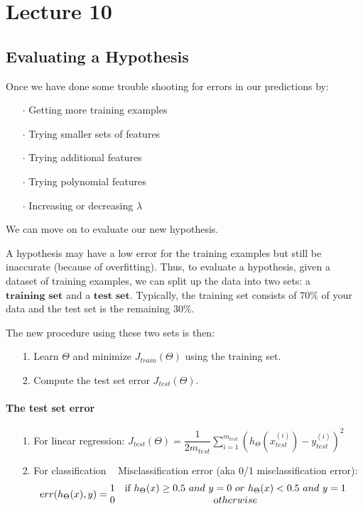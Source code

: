 \documentclass[UTF8]{article}
\begin{document}
\newpage

\section{Lecture 10}

\subsection{Evaluating a Hypothesis}

Once we have done some trouble shooting for errors in our predictions by:

\begin{itemize}
\item[$\cdot$]Getting more training examples
\item[$\cdot$]Trying smaller sets of features
\item[$\cdot$]Trying additional features
\item[$\cdot$]Trying polynomial features
\item[$\cdot$]Increasing or decreasing $\lambda$
\end{itemize}

We can move on to evaluate our new hypothesis.

A hypothesis may have a low error for the training examples but still be inaccurate (because of overfitting). Thus, to evaluate a hypothesis, given a dataset of training examples, we can split up the data into two sets: a $\textbf{training set}$ and a $\textbf{test set}$. Typically, the training set consists of $70\%$ of your data and the test set is the remaining $30\%$.

The new procedure using these two sets is then:

\begin{itemize}
\item[{1.}]Learn $\Theta$ and minimize $J_{train}(\Theta)$ using the training set.
\item[{2.}]Compute the test set error $J_{test}(\Theta)$.
\end{itemize}

\paragraph{The test set error}

\begin{itemize}
\item[{1.}]For linear regression: $J_{test}(\Theta) = \dfrac{1}{2m_{test}} \sum_{i=1}^{m_{test}}(h_\Theta(x^{(i)}_{test}) - y^{(i)}_{test})^2$
\item[{2.}]For classification ~ Misclassification error (aka 0/1 misclassification error):
\[err(h_\Theta(x),y) = \begin{matrix} 1 & \mbox{if } h_\Theta(x) \geq 0.5\ and\ y = 0\ or\ h_\Theta(x) < 0.5\ and\ y = 1\\ 0 & \mbox otherwise \end{matrix}\]
\end{itemize}
\end{document}
